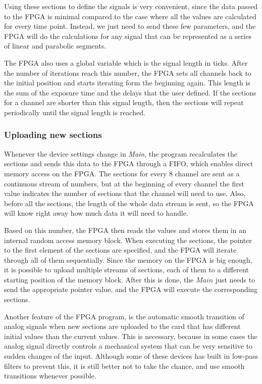 \documentclass{diploma_style}
\begin{document}
Using these sections to define the signals is very convenient, since the data passed to the FPGA is minimal compared to the case where all the values are calculated for every time point. Instead, we just need to send these few parameters, and the FPGA will do the calculations for any signal that can be represented as a series of linear and parabolic segments.

The FPGA also uses a global variable which is the signal length in ticks. After the number of iterations reach this number, the FPGA sets all channels back to the initial position and starts iterating form the beginning again. This length is the sum of the exposure time and the delays that the user defined. If the sections for a channel are shorter than this signal length, then the sections will repeat periodically until the signal length is reached.

\subsubsection{Uploading new sections}

Whenever the device settings change in \emph{Main}, the program recalculates the sections and sends this data to the FPGA through a FIFO, which enables direct memory access on the FPGA. The sections for every 8 channel are sent as a continuous stream of numbers, but at the beginning of every channel the first value indicates the number of sections that the channel will need to use. Also, before all the sections, the length of the whole data stream is sent, so the FPGA will know right away how much data it will need to handle.

Based on this number, the FPGA then reads the values and stores them in an internal random access memory block. When executing the sections, the pointer to the first element of the sections are specified, and the FPGA will iterate through all of them sequentially. Since the memory on the FPGA is big enough, it is possible to upload multiple streams of sections, each of them to a different starting position of the memory block. After this is done, the $Main$ just needs to send the appropriate pointer value, and the FPGA will execute the corresponding sections.

Another feature of the FPGA program, is the automatic smooth transition of analog signals when new sections are uploaded to the card that has different initial values than the current values. This is necessary, because in some cases the analog signal directly controls a mechanical system that can be very sensitive to sudden changes of the input. Although some of these devices has built in low-pass filters to prevent this, it is still better not to take the chance, and use smooth transitions whenever possible. 
\end{document}
